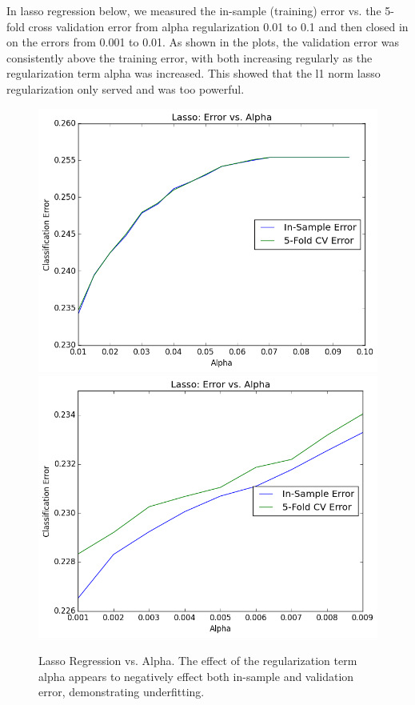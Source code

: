 \begin{itemize}
\begin{itemize}
In lasso regression below, we measured the in-sample (training) error vs. the 5-fold cross validation error from alpha regularization 0.01 to 0.1 and then closed in on the errors from 0.001 to 0.01. As shown in the plots, the validation error was consistently above the training error, with both increasing regularly as the regularization term alpha was increased. This showed that the l1 norm lasso regularization only served and was too powerful. 
\begin{figure}[H]
\centering
\includegraphics[scale=0.35]{lasso-vs-alpha2}
\includegraphics[scale=0.35]{lasso-vs-alpha}
\caption{Lasso Regression vs. Alpha. The effect of the regularization term alpha appears to negatively effect both in-sample and validation error, demonstrating underfitting.}

\end{figure}
\end{itemize}
\end{itemize}
